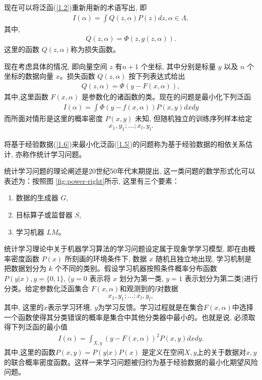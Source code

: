 现在可以将泛函(\ref{1.2})重新用新的术语写出, 即
\begin{align}\label{1.4}
I(\alpha) = \int Q(z,\alpha)P(z)dz, \alpha \in \Lambda,
\end{align}
其中,
\begin{align}
Q(z,\alpha) = \Phi(z,g(z,\alpha)).
\end{align}
这里的函数 $Q(z,\alpha)$称为损失函数。

现在考虑具体的情况, 即向量空间 $z$ 有$n+1$ 个坐标, 其中分别是标量 $y$ 以及 $n$ 个坐标的数据向量 $x$。损失函数 $Q(z,\alpha)$ 按下列表达式给出
\begin{align}
Q(z,\alpha) = \Phi(y - F(x,\alpha)),
\end{align}
其中,这里函数 $F(x,\alpha)$ 是参数化的诸函数的类。现在的问题是最小化下列泛函
\begin{align}\label{1.5}
I(\alpha) = \int \Phi(y-f(x,\alpha))P(x,y)dxdy
\end{align}
而所面对情形是这里的概率密度 $P(x,y)$ 未知, 但随机独立的训练序列样本给定
\begin{align}\label{1.6}
x_1,y_1; \ldots; x_l,y_l.
\end{align}

将基于经验数据(\ref{1.6})来最小化泛函(\ref{1.5})的问题称为基于经验数据的相依关系估计, 亦称作统计学习问题。


统计学习问题的理论阐述是20世纪50年代末期提出\citep{Rosenblatt1962,Novikoff1962,vapnik1963,vapnik1964,vapnik1964On,vapnik1968,vapnik1971,vapnik1974,vapnik1979}, 这一类问题的数学形式化可以表述为：按照图 \ref{fig:power-right}所示, 这里有三个要素：
\begin{enumerate}
\item 数据的生成器 $G$,
\item 目标算子或监督器 $S$,
\item 学习机器 $LM$。
\end{enumerate}

统计学习理论中关于机器学习算法的学习问题设定属于现象学学习模型\citep{Vapnik-rethinking-2018,wangdefeng2005}, 即在由概率密度函数 $P(x)$ 所刻画的环境条件下, 数据 $x$ 随机且独立地出现, 学习机制是把数据划分为 $k$ 个不同的类别。假设学习机器按照条件概率分布函数 $P(y | x), y = \{0,1\}$, ($y=0$ 表示将 $x$ 划分为第一类,  $y=1$ 表示划分为第二类)进行分类。给定参数化泛函集合 $F(x,\alpha)$和观测到的$l$对数据
\begin{align}
x_1, y_1; \ldots; x_l, y_l,
\end{align}
其中, 这里的$x$表示学习环境, $y$为学习反馈。学习过程就是在集合$F(x,\alpha)$中选择一个函数使得其分类错误的概率是集合中其他分类器中最小的。也就是说, 必须取得下列泛函的最小值
\begin{align}
I(\alpha) = \int_{X,y}^{} (y - F(x,\alpha))^2P(x,y)dxdy.
\end{align}
其中,这里的函数$P(x,y) = P(y | x)P(x)$ 是定义在空间$X, y$上的关于数据对$x, y$的联合概率密度函数。这样一来学习问题被归约为基于经验数据的最小化期望风险问题。

